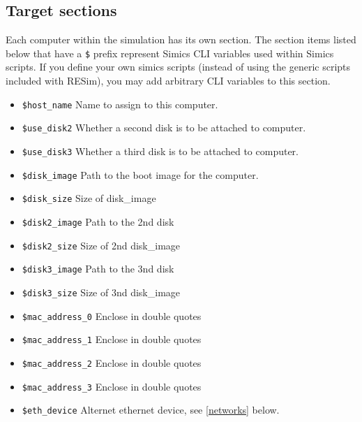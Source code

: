 \documentclass[titlepage]{article}
\begin{document}
\subsection{Target sections}
Each computer within the simulation has its own section. The section items listed below that 
have a {\tt \$} prefix represent Simics CLI variables used within Simics scripts.  If you define your own
simics scripts (instead of using the generic scripts included with RESim), you may add arbitrary CLI variables
to this section. 
\begin{itemize}
\item {\tt \$host\_name} Name to assign to this computer.
\item {\tt \$use\_disk2} Whether a second disk is to be attached to computer.
\item {\tt \$use\_disk3} Whether a third disk is to be attached to computer.
\item {\tt \$disk\_image} Path to the boot image for the computer.
\item {\tt \$disk\_size} Size of disk\_image
\item {\tt \$disk2\_image} Path to the 2nd disk
\item {\tt \$disk2\_size} Size of 2nd disk\_image
\item {\tt \$disk3\_image} Path to the 3nd disk
\item {\tt \$disk3\_size} Size of 3nd disk\_image
\item {\tt \$mac\_address\_0} Enclose in double quotes
\item {\tt \$mac\_address\_1} Enclose in double quotes
\item {\tt \$mac\_address\_2} Enclose in double quotes
\item {\tt \$mac\_address\_3} Enclose in double quotes
\item {\tt \$eth\_device} Alternet ethernet device, see \ref{networks} below.


\end{itemize}
\end{document}
